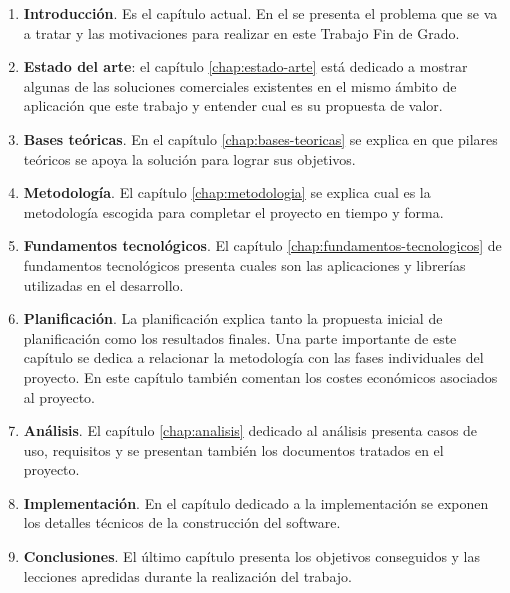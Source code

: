 \begin{enumerate}
    \item \textbf{Introducción}. Es el capítulo actual. En el se presenta el problema que se va a tratar y las motivaciones para realizar en este Trabajo Fin de Grado.
    \item \textbf{Estado del arte}: el capítulo \ref{chap:estado-arte} está dedicado a mostrar algunas de las soluciones comerciales existentes en el mismo ámbito de aplicación que este trabajo y entender cual es su propuesta de valor.
    \item \textbf{Bases teóricas}. En el capítulo \ref{chap:bases-teoricas} se explica en que pilares teóricos se apoya la solución para lograr sus objetivos.
    \item \textbf{Metodología}. El capítulo \ref{chap:metodologia} se explica cual es la metodología escogida para completar el proyecto en tiempo y forma.
    \item \textbf{Fundamentos tecnológicos}. El capítulo \ref{chap:fundamentos-tecnologicos} de fundamentos tecnológicos presenta cuales son las aplicaciones y librerías utilizadas en el desarrollo.
    \item \textbf{Planificación}. La planificación explica tanto la propuesta inicial de planificación como los resultados finales. Una parte importante de este capítulo se dedica a relacionar la metodología con las fases individuales del proyecto. En este capítulo también comentan los costes económicos asociados al proyecto.
    \item \textbf{Análisis}. El capítulo \ref{chap:analisis} dedicado al análisis presenta casos de uso, requisitos y se presentan también los documentos tratados en el proyecto.
    \item \textbf{Implementación}. En el capítulo dedicado a la implementación se exponen los detalles técnicos de la construcción del software.
    \item \textbf{Conclusiones}. El último capítulo presenta los objetivos conseguidos y las lecciones apredidas durante la realización del trabajo.
\end{enumerate}
